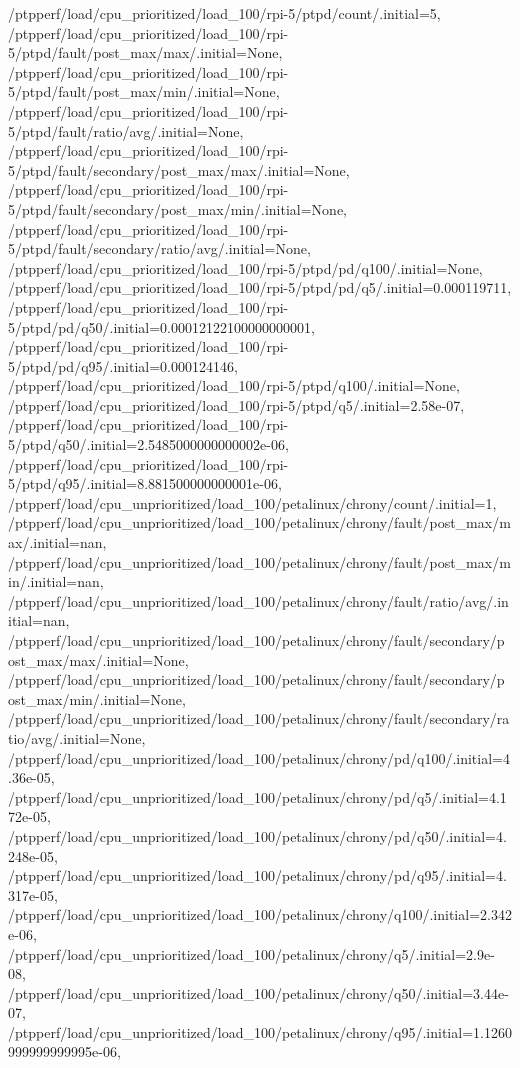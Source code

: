 {    /ptpperf/load/cpu_prioritized/load_100/rpi-5/ptpd/count/.initial=5,
    /ptpperf/load/cpu_prioritized/load_100/rpi-5/ptpd/fault/post_max/max/.initial=None,
    /ptpperf/load/cpu_prioritized/load_100/rpi-5/ptpd/fault/post_max/min/.initial=None,
    /ptpperf/load/cpu_prioritized/load_100/rpi-5/ptpd/fault/ratio/avg/.initial=None,
    /ptpperf/load/cpu_prioritized/load_100/rpi-5/ptpd/fault/secondary/post_max/max/.initial=None,
    /ptpperf/load/cpu_prioritized/load_100/rpi-5/ptpd/fault/secondary/post_max/min/.initial=None,
    /ptpperf/load/cpu_prioritized/load_100/rpi-5/ptpd/fault/secondary/ratio/avg/.initial=None,
    /ptpperf/load/cpu_prioritized/load_100/rpi-5/ptpd/pd/q100/.initial=None,
    /ptpperf/load/cpu_prioritized/load_100/rpi-5/ptpd/pd/q5/.initial=0.000119711,
    /ptpperf/load/cpu_prioritized/load_100/rpi-5/ptpd/pd/q50/.initial=0.00012122100000000001,
    /ptpperf/load/cpu_prioritized/load_100/rpi-5/ptpd/pd/q95/.initial=0.000124146,
    /ptpperf/load/cpu_prioritized/load_100/rpi-5/ptpd/q100/.initial=None,
    /ptpperf/load/cpu_prioritized/load_100/rpi-5/ptpd/q5/.initial=2.58e-07,
    /ptpperf/load/cpu_prioritized/load_100/rpi-5/ptpd/q50/.initial=2.5485000000000002e-06,
    /ptpperf/load/cpu_prioritized/load_100/rpi-5/ptpd/q95/.initial=8.881500000000001e-06,
    /ptpperf/load/cpu_unprioritized/load_100/petalinux/chrony/count/.initial=1,
    /ptpperf/load/cpu_unprioritized/load_100/petalinux/chrony/fault/post_max/max/.initial=nan,
    /ptpperf/load/cpu_unprioritized/load_100/petalinux/chrony/fault/post_max/min/.initial=nan,
    /ptpperf/load/cpu_unprioritized/load_100/petalinux/chrony/fault/ratio/avg/.initial=nan,
    /ptpperf/load/cpu_unprioritized/load_100/petalinux/chrony/fault/secondary/post_max/max/.initial=None,
    /ptpperf/load/cpu_unprioritized/load_100/petalinux/chrony/fault/secondary/post_max/min/.initial=None,
    /ptpperf/load/cpu_unprioritized/load_100/petalinux/chrony/fault/secondary/ratio/avg/.initial=None,
    /ptpperf/load/cpu_unprioritized/load_100/petalinux/chrony/pd/q100/.initial=4.36e-05,
    /ptpperf/load/cpu_unprioritized/load_100/petalinux/chrony/pd/q5/.initial=4.172e-05,
    /ptpperf/load/cpu_unprioritized/load_100/petalinux/chrony/pd/q50/.initial=4.248e-05,
    /ptpperf/load/cpu_unprioritized/load_100/petalinux/chrony/pd/q95/.initial=4.317e-05,
    /ptpperf/load/cpu_unprioritized/load_100/petalinux/chrony/q100/.initial=2.342e-06,
    /ptpperf/load/cpu_unprioritized/load_100/petalinux/chrony/q5/.initial=2.9e-08,
    /ptpperf/load/cpu_unprioritized/load_100/petalinux/chrony/q50/.initial=3.44e-07,
    /ptpperf/load/cpu_unprioritized/load_100/petalinux/chrony/q95/.initial=1.1260999999999995e-06,
}
